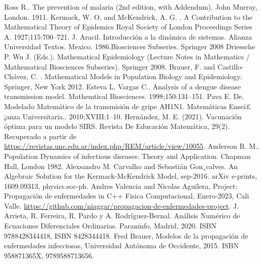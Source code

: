 \documentclass[journal]{IEEEtran}
\begin{document}
\begin{thebibliography}{1}

  Ross R.. The prevention of malaria (2nd edition, with Addendum). John
  Murray, London. 1911.
  Kermack, W. O. and McKendrick, A. G. . A Contribution to the
  Mathematical Theory of Epidemics
  Royal Society of London Proceedings Series A. 1927;115:700–721.
  J. Aracil. Introducción a la dinámica de sistemas. Alianza Universidad Textos.
  Mexico. 1986.Biosciences Subseries. Springer 2008
  Driessche P. Wu J. (Eds.). Mathematical Epidemiology (Lecture Notes in
  Mathematics / Mathematical
  Biosciences Subseries). Springer 2008.
  Brauer, F. and Castillo-Chávez, C. . Mathematical Models in Population
  Biology and Epidemiology.
  Springer, New York 2012.
  Esteva L. Vargas C.. Analysis of a dengue disease transmission model.
  Mathemtical Biosciences.
  1998;150:131–151.
  Pava E. De. Modelado Matemático de la transmisión de gripe AH1N1.
  Matemáticas Enseï£¡anza
  Universitaria.. 2010;XVIII:1–10.
  Hernández, M. E. (2021). Vacunación óptima para un modelo SIRS. Revista
  De Educación Matemática, 29(2).
  Recuperado a partir de
  \url{https://revistas.unc.edu.ar/index.php/REM/article/view/10055}.
  Anderson R. M.. Population Dynamics of infectious diseases: Theory and
  Application. Chapman
  Hall, London 1982.
  Alexsandro M. Carvalho and Sebastián Gon¸calves. An Algebraic Solution
  for the Kermack-McKendrick Model, sep-2016.
  arXiv e-prints, 1609.09313, physics.soc-ph.
  Andres Valencia and Nicolas Aguilera, Project: Propagación de
  enfermedades in C++
  Fisica Computacional, Enero-2023, Cali Valle.
  \url{https://github.com/niaggar/propagacion-de-enfermedades-project}.
  J. Arrieta, R. Ferreira, R. Pardo y A. Rodríguez-Bernal. Análisis Numérico
  de Ecuaciones Diferenciales Ordinarias.
  Paraninfo, Madrid, 2020. ISBN 9788428344418, ISBN 8428344418.
  Fred Brauer, Modelos de la propagación de enfermedades infecciosas,
  Universidad Autónoma de Occidente, 2015. ISBN	958871365X, 9789588713656.

\end{thebibliography}
\end{document}
